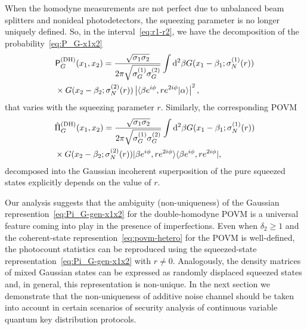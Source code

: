 \documentclass[%
reprint,
superscriptaddress,
 amsmath,amssymb,amsfonts,
 aps,
 pra,
 longbibliography
]{revtex4-2}
\newcommand{\ket}[1]{\ensuremath{|{#1}\rangle}}
\newcommand{\bra}[1]{\ensuremath{\langle{#1}|}}
\newcommand{\avr}[1]{\ensuremath{\langle{#1}\rangle}}
\newcommand{\ind}[1]{\mathrm{#1}}
\newcommand{\prob}{\mathsf{P}}
\newcommand{\dd}{\mathrm{d}}
\DeclareMathOperator*{\argmax}{arg\,max}
\begin{document}
When the homodyne measurements are not
perfect due to unbalanced beam splitters and nonideal photodetectors,
the squeezing parameter is no longer uniquely defined.
So, in the interval~\eqref{eq:r1-r2},
we have the decomposition of
the probability~\eqref{eq:P_G-x1x2}
\begin{align}
  \label{eq:P_G-gen-x1x2-2}
  &
  \prob_G^{(\ind{DH})}(x_1,x_2)
                                 =\frac{\sqrt{\sigma_1\sigma_2}}{2\pi\sqrt{\sigma_G^{(1)}\sigma_G^{(2)}}}
                                 \int \dd^2 \beta G(x_1-\beta_1;\sigma_N^{(1)}(r))
\notag
  \\
  &
    \times
    G(x_2-\beta_2;\sigma_N^{(2)}(r))
    \left|\avr{\beta e^{i\phi},r e^{2i\phi}|\alpha}\right|^2, 
\end{align}
that varies with the squeezing parameter $r$.
Similarly,
the corresponding POVM 
\begin{align}
  \label{eq:Pi_G-gen-x1x2}
  &
    \hat{\Pi}_G^{(\ind{DH})}(x_1,x_2)=\frac{\sqrt{\sigma_1\sigma_2}}{2\pi\sqrt{\sigma_G^{(1)}\sigma_G^{(2)}}}
    \int \dd^2 \beta G(x_1-\beta_1;\sigma_N^{(1)}(r))
    \notag
  \\
  &
    \times
    G(x_2-\beta_2;\sigma_N^{(2)}(r))
    \ket{\beta e^{i\phi},r e^{2i\phi}}\bra{\beta e^{i\phi},r e^{2i\phi}},
\end{align}
decomposed into
the Gaussian incoherent superposition
of the pure squeezed states explicitly depends on the value of $r$.%

Our analysis suggests that  the ambiguity (non-uniqueness) of
the Gaussian represention~\eqref{eq:Pi_G-gen-x1x2} for the double-homodyne
POVM is a universal feature coming into play in the presence of imperfections.
Even when $\delta_2\ge 1$ and
the coherent-state represention~\eqref{eq:povm-hetero} for the POVM is well-defined,
the photocount statistics can be reproduced using
the squeezed-state representation~\eqref{eq:Pi_G-gen-x1x2}
with $r\neq 0$.
Analogously, the density matrices of mixed Gaussian states can be
expressed as randomly displaced squeezed states and, in general, this
representation is non-unique.
In the next section we demonstrate that
the non-uniqueness of additive noise channel
should be taken into account in
certain scenarios of security analysis of
continuous variable quantum key distribution protocols.

\end{document}
